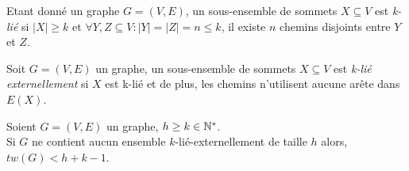 



\label{kconnected}
	Etant donné un graphe $G = (V,E)$, un sous-ensemble de sommets $X \subseteq V$
	est {\em k-lié} si $|X| \geq k$ et $\forall Y,Z \subseteq V : |Y| = |Z| = n \leq k$,
	il existe $n$ chemins disjoints entre $Y$ et $Z$.

\label{kextconnected}
	Soit $G = (V,E)$ un graphe, un sous-ensemble de sommets $X \subseteq V$
	est {\em k-lié externellement} si $X$ est k-lié et de plus, les chemins n'utilisent
	aucune arête dans $E(X)$.

\label{propdiestelh}
	Soient $G = (V,E)$ un graphe, $h \geq k \in \mathbb{N}^*$.\\
	Si $G$ ne contient aucun ensemble $k$-lié-externellement de taille $h$ alors,
	$tw(G) < h + k - 1$.

